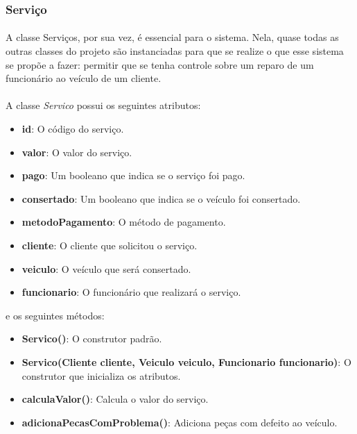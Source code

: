 \documentclass[a4paper,12pt]{article}
\begin{document}
\subsubsection{Serviço}
\paragraph{}
A classe Serviços, por sua vez, é essencial para o sistema. Nela, quase todas as outras classes do projeto são instanciadas para que se realize o que esse sistema se propõe a fazer: permitir que se tenha controle sobre um reparo de um funcionário ao veículo de um cliente.

\paragraph{}
A classe \textit{Servico} possui os seguintes atributos:

\begin{itemize}[noitemsep]
    \item \textbf{id}: O código do serviço.
    \item \textbf{valor}: O valor do serviço.
    \item \textbf{pago}: Um booleano que indica se o serviço foi pago.
    \item \textbf{consertado}: Um booleano que indica se o veículo foi consertado.
    \item \textbf{metodoPagamento}: O método de pagamento.
    \item \textbf{cliente}: O cliente que solicitou o serviço.
    \item \textbf{veiculo}: O veículo que será consertado.
    \item \textbf{funcionario}: O funcionário que realizará o serviço.
\end{itemize}

\noindent e os seguintes métodos:

\begin{itemize}[noitemsep]
    \item \textbf{Servico()}: O construtor padrão.
    \item \textbf{Servico(Cliente cliente, Veiculo veiculo, Funcionario funcionario)}: O construtor que inicializa os atributos.
    \item \textbf{calculaValor()}: Calcula o valor do serviço.
    \item \textbf{adicionaPecasComProblema()}: Adiciona peças com defeito ao veículo.
\end{itemize}
\end{document}
